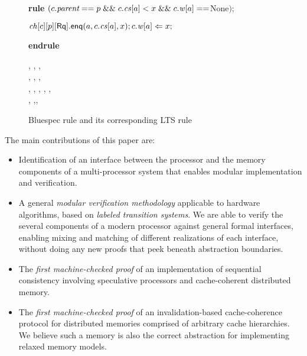 \begin{figure}[t]
\centering
\begin{boxedminipage}{\columnwidth}
\small
\noindent \textbf{rule} $(c.\textit{parent} == p \; \mathit{\&\&} \; c.\mathit{cs}[a] < x \; \mathit{\&\&} \; c.\mathit{w}[a]==$None$);$

\hspace{1cm} $\mathit{ch}[c][p][\mathsf{Rq}].\mathsf{enq}(a,c.\mathit{cs}[a],x); c.\mathit{w}[a] \Leftarrow x;$

\textbf{endrule}
\end{boxedminipage}
\begin{boxedminipage}{\columnwidth}
\small
{}
{
{\dt, \ch, \s,\\ \dst, \wt, \dwt,\\ \inp, \outp}
{\dt, , \s, \dst,\\
\wt[(c,a)\coloneqq x], \dwt,\inp, \outp}{}}
\end{boxedminipage}
\caption{Bluespec rule and its corresponding LTS rule}
\label{both}
\end{figure}

The main contributions of this paper are:

\begin{itemize} 
\item Identification of an interface between the processor and the memory
components of a multi-processor system that enables modular implementation and
verification.

\item A general \emph{modular verification methodology} applicable to hardware
  algorithms, based on \emph{labeled transition systems}.
We are able to verify
  the several components of a modern processor 
against general formal interfaces,
  enabling mixing and matching of different realizations of each interface,
  without doing any new proofs that peek beneath abstraction boundaries.

\item The \emph{first machine-checked proof} of an implementation of sequential
  consistency involving speculative processors and cache-coherent distributed
  memory.

\item The \emph{first machine-checked proof} of an invalidation-based
  cache-coherence protocol for distributed memories comprised of arbitrary
  cache hierarchies. We believe such a memory is also the correct abstraction for
  implementing relaxed memory models.
\end{itemize}

